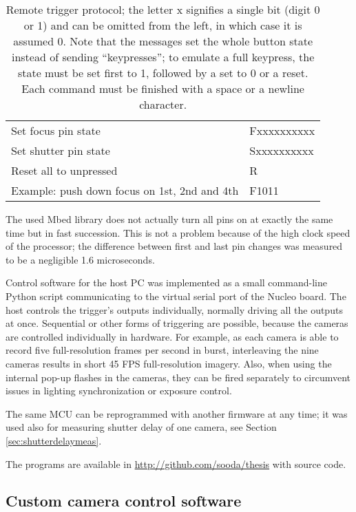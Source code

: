 \begin{table}[t]
	\centering
	\begin{tabular}{l l}
		Set focus pin state & Fxxxxxxxxxx\\
		Set shutter pin state & Sxxxxxxxxxx\\
		Reset all to unpressed & R\\
		Example: push down focus on 1st, 2nd and 4th & F1011\\
	\end{tabular}
	\caption{
		Remote trigger protocol; the letter x signifies a single bit (digit 0 or 1) and can be omitted from the left, in which case it is assumed 0.
		Note that the messages set the whole button state instead of sending ``keypresses'';
		to emulate a full keypress, the state must be set first to 1, followed by a set to 0 or a reset.
		Each command must be finished with a space or a newline character.
	}
	\label{tab:triggerprotocol}
\end{table}

The used Mbed library does not actually turn all pins on at exactly the same time but in fast succession.
This is not a problem because of the high clock speed of the processor;
the difference between first and last pin changes was measured to be a negligible 1.6 microseconds.

Control software for the host PC was implemented as a small command-line Python script communicating to the virtual serial port of the Nucleo board.
The host controls the trigger's outputs individually, normally driving all the outputs at once.
Sequential or other forms of triggering are possible, because the cameras are controlled individually in hardware.
For example, as each camera is able to record five full-resolution frames per second in burst, interleaving the nine cameras results in short 45 FPS full-resolution imagery.
Also, when using the internal pop-up flashes in the cameras, they can be fired separately to circumvent issues in lighting synchronization or exposure control.

The same MCU can be reprogrammed with another firmware at any time; it was used also for measuring shutter delay of one camera, see Section \ref{sec:shutterdelaymeas}.

The programs are available in \url {http://github.com/sooda/thesis} with source code.


\subsection{Custom camera control software} %

